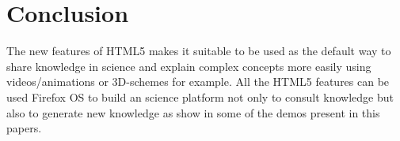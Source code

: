 \section*{Conclusion}

The new features of HTML5 makes it suitable to be used as the default way to
share knowledge in science and explain complex concepts more easily using
videos/animations or 3D-schemes for example. All the HTML5 features can be used
Firefox OS to build an science platform not only to consult knowledge but also
to generate new knowledge as show in some of the demos present in this papers.
